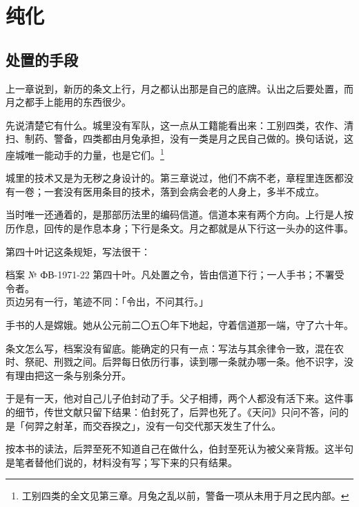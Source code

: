 \chapter{纯化}


\section{处置的手段}

上一章说到，新历的条文上行，月之都认出那是自己的底牌。认出之后要处置，而月之都手上能用的东西很少。

先说清楚它有什么。城里没有军队，这一点从工籍能看出来：工别四类，农作、清扫、制药、警备，四类都由月兔承担，没有一类是月之民自己做的。换句话说，这座城唯一能动手的力量，也是它们。\footnote{工别四类的全文见第三章。月兔之乱以前，警备一项从未用于月之民内部。}

城里的技术又是为无秽之身设计的。第三章说过，他们不病不老，章程里连医都没有一卷；一套没有医用条目的技术，落到会病会老的人身上，多半不成立。

当时唯一还通着的，是那部历法里的编码信道。信道本来有两个方向。上行是人按历作息，回传的是作息本身；下行是条文。月之都就是从下行这一头办的这件事。

第四十叶记这条规矩，写法很干：

\begin{archive}[内部参考]{档案 № ФВ-1971-22}
第四十叶。凡处置之令，皆由信道下行；一人手书；不署受令者。\\
页边另有一行，笔迹不同：「令出，不问其行。」
\end{archive}

手书的人是嫦娥。她从公元前二〇五〇年下地起，守着信道那一端，守了六十年。

条文怎么写，档案没有留底。能确定的只有一点：写法与其余律令一致，混在农时、祭祀、刑戮之间。后羿每日依历行事，读到哪一条就办哪一条。他不识字，没有理由把这一条与别条分开。

于是有一天，他对自己儿子伯封动了手。父子相搏，两个人都没有活下来。这件事的细节，传世文献只留下结果：伯封死了，后羿也死了。《天问》只问不答，问的是「何羿之射革，而交吞揆之」，没有一句交代那天发生了什么。

按本书的读法，后羿至死不知道自己在做什么，伯封至死认为被父亲背叛。这半句是笔者替他们说的，材料没有写；写下来的只有结果。

